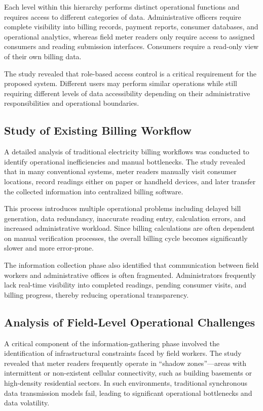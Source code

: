 \documentclass[12pt, a4paper, onecolumn]{report}
\begin{document}
Each level within this hierarchy performs distinct operational functions and requires access to different categories of data. Administrative officers require complete visibility into billing records, payment reports, consumer databases, and operational analytics, whereas field meter readers only require access to assigned consumers and reading submission interfaces. Consumers require a read-only view of their own billing data.

The study revealed that role-based access control is a critical requirement for the proposed system. Different users may perform similar operations while still requiring different levels of data accessibility depending on their administrative responsibilities and operational boundaries.

\subsection{Study of Existing Billing Workflow}

A detailed analysis of traditional electricity billing workflows was conducted to identify operational inefficiencies and manual bottlenecks. The study revealed that in many conventional systems, meter readers manually visit consumer locations, record readings either on paper or handheld devices, and later transfer the collected information into centralized billing software.

This process introduces multiple operational problems including delayed bill generation, data redundancy, inaccurate reading entry, calculation errors, and increased administrative workload. Since billing calculations are often dependent on manual verification processes, the overall billing cycle becomes significantly slower and more error-prone.

The information collection phase also identified that communication between field workers and administrative offices is often fragmented. Administrators frequently lack real-time visibility into completed readings, pending consumer visits, and billing progress, thereby reducing operational transparency.

\subsection{Analysis of Field-Level Operational Challenges}
A critical component of the information-gathering phase involved the identification of infrastructural constraints faced by field workers. The study revealed that meter readers frequently operate in ``shadow zones''---areas with intermittent or non-existent cellular connectivity, such as building basements or high-density residential sectors. In such environments, traditional synchronous data transmission models fail, leading to significant operational bottlenecks and data volatility.
\end{document}
